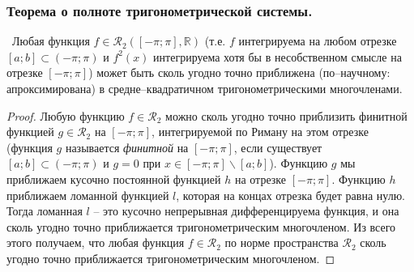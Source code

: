 \subsubsection{Теорема о полноте тригонометрической системы.}

\begin{theorem*} \ Любая функция $f \in \mathcal{R}_2(\left[ -\pi; \pi \right], \mathbb{R})$ (т.е. $f$ интегрируема на любом отрезке $\left[a; b\right] \subset \left( -\pi; \pi \right)$ и $f^2(x)$ интегрируема хотя бы в несобственном смысле на отрезке $\left[ -\pi; \pi \right]$) может быть сколь угодно точно приближена (по--научному: апроксимирована) в средне--квадратичном тригонометрическими многочленами.
\end{theorem*}
\begin{proof} Любую функцию $f \in \mathcal{R}_2$  можно сколь угодно точно  приблизить финитной функцией $g \in \mathcal{R}_2$ на $\left[-\pi; \pi\right]$, интегрируемой по Риману на этом отрезке (функция $g$ называется \textit{финитной} на $[-\pi; \pi]$, если существует $[a; b]\subset(-\pi; \pi)$ и $g = 0$ при $x \in [-\pi; \pi] \backslash [a; b]$). Функцию $g$ мы приближаем кусочно постоянной функцией $h$ на отрезке $[-\pi; \pi]$.   Функцию $h$ приближаем ломанной функцией $l$, которая на концах отрезка будет равна нулю. Тогда ломанная $l$ -- это кусочно непрерывная дифференцируема функция, и она сколь угодно точно приближается тригонометрическим многочленом.  Из всего этого получаем, что любая функция $f \in \mathcal{R}_2$  по норме пространства $\mathcal{R}_2$  сколь угодно точно приближается  тригонометрическим многочленом.
\end{proof}